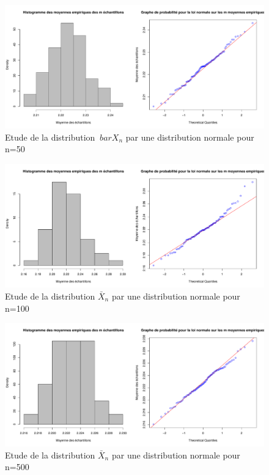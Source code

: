 \documentclass[12pt]{article}
\begin{document}
\begin{enumerate}
\begin{figure}[ht]
\centering
\includegraphics[width=1.0\textwidth]{figures/GraphP2Q53.pdf}
\caption{Etude de la distribution $\ bar X_n$ par une distribution normale pour n=50}
\end{figure}

\begin{figure}[ht]
\centering
\includegraphics[width=1.0\textwidth]{figures/GraphP2Q54.pdf}
\caption{Etude de la distribution $\bar X_n$ par une distribution normale pour n=100}
\end{figure}

\begin{figure}[ht]
\centering
\includegraphics[width=1.0\textwidth]{figures/GraphP2Q55.pdf}
\caption{Etude de la distribution $\bar X_n$ par une distribution normale pour n=500}
\end{figure}

\end{enumerate}
\end{document}
